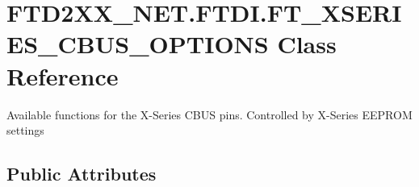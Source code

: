 \hypertarget{class_f_t_d2_x_x___n_e_t_1_1_f_t_d_i_1_1_f_t___x_s_e_r_i_e_s___c_b_u_s___o_p_t_i_o_n_s}{}\section{F\+T\+D2\+X\+X\+\_\+\+N\+E\+T.\+F\+T\+D\+I.\+F\+T\+\_\+\+X\+S\+E\+R\+I\+E\+S\+\_\+\+C\+B\+U\+S\+\_\+\+O\+P\+T\+I\+O\+NS Class Reference}
\label{class_f_t_d2_x_x___n_e_t_1_1_f_t_d_i_1_1_f_t___x_s_e_r_i_e_s___c_b_u_s___o_p_t_i_o_n_s}


Available functions for the X-\/\+Series C\+B\+US pins. Controlled by X-\/\+Series E\+E\+P\+R\+OM settings  


\subsection*{Public Attributes}
